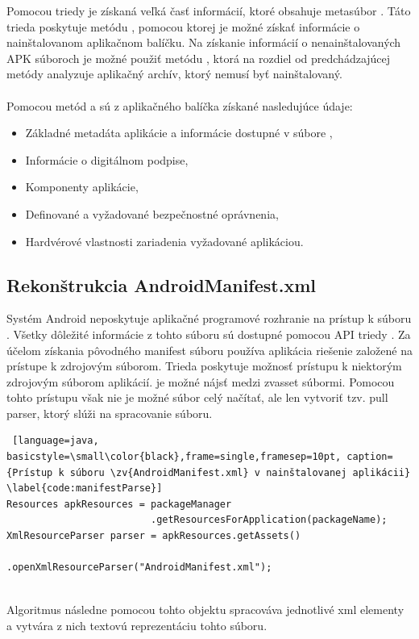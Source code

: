 Pomocou triedy  je získaná veľká časť informácií, ktoré obsahuje metasúbor . Táto trieda poskytuje metódu , pomocou ktorej je možné získať informácie o nainštalovanom aplikačnom balíčku. Na získanie informácií o nenainštalovaných APK súboroch je možné použiť metódu , ktorá na rozdiel od predchádzajúcej metódy analyzuje aplikačný archív, ktorý nemusí byť nainštalovaný.
\\\\
\noindent Pomocou metód  a  sú z aplikačného balíčka získané nasledujúce údaje:
\begin{itemize}
	\item Základné metadáta aplikácie a informácie dostupné v súbore ,
	\item Informácie o digitálnom podpise,
	\item Komponenty aplikácie,
	\item Definované a vyžadované bezpečnostné oprávnenia,
	\item Hardvérové vlastnosti zariadenia vyžadované aplikáciou.
\end{itemize}

\subsection{Rekonštrukcia AndroidManifest.xml}
Systém Android neposkytuje aplikačné programové rozhranie na prístup k súboru . Všetky dôležité informácie z tohto súboru sú dostupné pomocou API triedy . Za účelom získania pôvodného manifest súboru používa aplikácia  riešenie založené na prístupe k zdrojovým súborom. Trieda  poskytuje možnosť prístupu k niektorým zdrojovým súborom aplikácií.  je možné nájsť medzi 
zv{asset} súbormi. Pomocou tohto prístupu však nie je možné súbor celý načítať, ale len vytvoriť tzv. pull parser, ktorý slúži na spracovanie  súboru.\\ 
\begin{lstlisting} [language=java, basicstyle=\small\color{black},frame=single,framesep=10pt, caption= {Prístup k súboru \zv{AndroidManifest.xml} v nainštalovanej aplikácii} \label{code:manifestParse}]
Resources apkResources = packageManager
                         .getResourcesForApplication(packageName);
XmlResourceParser parser = apkResources.getAssets()
                         .openXmlResourceParser("AndroidManifest.xml");
\end{lstlisting}
\mbox{}\\
\noindent Algoritmus následne pomocou tohto objektu spracováva jednotlivé xml elementy a vytvára z nich textovú reprezentáciu tohto súboru.


